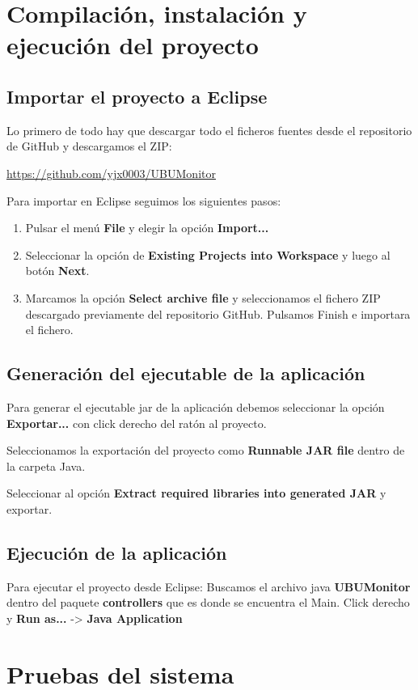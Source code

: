 \section{Compilación, instalación y ejecución del proyecto}

\subsection{Importar el proyecto a Eclipse}
Lo primero de todo hay que descargar todo el ficheros fuentes desde el repositorio de GitHub y descargamos el ZIP:

\href{https://github.com/yjx0003/UBUMonitor}{https://github.com/yjx0003/UBUMonitor}

Para importar en Eclipse seguimos los siguientes pasos:

\begin{enumerate}
	\item Pulsar el menú \textbf{File} y elegir la opción \textbf{Import...}
	\item Seleccionar la opción de \textbf{Existing Projects into
		Workspace} y luego al botón \textbf{Next}.
	\item Marcamos la opción \textbf{Select archive file} y seleccionamos el fichero ZIP descargado previamente del repositorio GitHub. Pulsamos Finish e importara el fichero.
	
\end{enumerate}

\subsection{Generación del ejecutable de la aplicación}

Para generar el ejecutable jar de la aplicación debemos seleccionar la opción \textbf{Exportar...} con click derecho del ratón al proyecto.

Seleccionamos la exportación del proyecto como \textbf{Runnable JAR file} dentro de la carpeta Java.


Seleccionar al opción \textbf{Extract required libraries into generated JAR} y exportar.


\subsection{Ejecución de la aplicación}

Para ejecutar el proyecto desde Eclipse: Buscamos el archivo java \textbf{UBUMonitor} dentro del paquete \textbf{controllers} que es donde se encuentra el Main. Click derecho y \textbf{Run as...} -> \textbf{Java Application}

\section{Pruebas del sistema}
